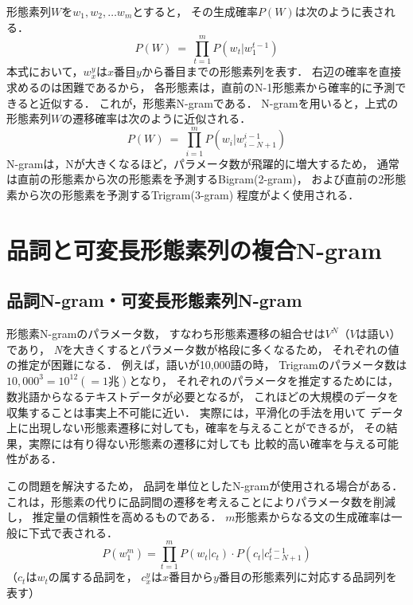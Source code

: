 形態素列$W$を$w_1, w_2 , \ldots w_m$とすると，
その生成確率$P(W)$は次のように表される．
\begin{equation}
P(W) ~=~ \prod_{t=1}^m P(w_t|w_1^{t-1})
\end{equation}
本式において，$w_x^y$は$x$番目$y$から番目までの形態素列を表す．
\mbox{右辺の確率を直接求めるのは困}難であるから，
各形態素は，直前のN-1形態素から確率的に予測できると近似する．
これが，形態素N-gramである．
N-gramを用いると，上式の形態素列$W$の遷移確率は次のように近似される．
\begin{equation}
P(W) ~=~ \prod_{i=1}^m P(w_i|w_{i-N+1}^{i-1})
\end{equation}
N-gramは，Nが大きくなるほど，パラメータ数が飛躍的に増大するため，
通常は直前の形態素から次の形態素を予測するBigram(2-gram)，
および直前の2形態素から次の形態素を予測するTrigram(3-gram)
程度がよく使用される．



\section{品詞と可変長形態素列の複合N-gram}

\subsection{品詞N-gram・可変長形態素列N-gram}
形態素N-gramのパラメータ数，
すなわち形態素遷移の組合せは$V^N$（$V$は語い）であり，
{\it N}を大きくするとパラメータ数が格段に多くなるため，
それぞれの値の推定が困難になる．
例えば，語いが10,000語の時，
Trigramのパラメータ数は$10,000^3 = 10^{12} (=1兆)$となり，
それぞれのパラメータを推定するためには，
数兆語からなるテキストデータが必要となるが，
これほどの大規模のデータを収集することは事実上不可能に近い．
実際には，平滑化\cite{Jelinek}\cite{Katz}の手法を用いて
データ上に出現しない形態素遷移に対しても，確率を与えることができるが，
その結果，実際には有り得ない形態素の遷移に対しても
比較的高い確率を与える可能性がある．

この問題を解決するため，
品詞を単位としたN-gramが使用される場合がある\cite{Nagata}．
これは，形態素の代りに品詞間の遷移を考えることによりパラメータ数を削減し，
推定量の信頼性を高めるものである．
$m$形態素からなる文の生成確率は一般に下式で表される．
\begin{equation}
 P(w_1^m) = \prod_{t=1}^m P(w_t | c_t) \cdot P(c_t | c_{t-N+1}^{t-1})
\end{equation}
（$c_t$は$w_t$の属する品詞を，
$c_x^y$は$x$番目から$y$番目の形態素列に対応する品詞列を表す）

